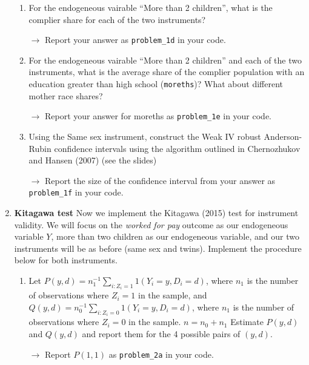 \documentclass[11pt, a4paper]{article}
\begin{document}
\begin{enumerate}
\begin{enumerate}
  \item For the endogeneous vairable ``More than 2 children'', what is
    the complier share for each of the two instruments?
    
        \hspace{10pt} $\rightarrow$ Report your answer as \texttt{problem\_1d} in your code.
        
  \item For the endogeneous vairable ``More than 2 children'' and each
    of the two instruments, what is the average share of the complier
    population with an education greater than high school
    (\texttt{moreths})? What about different mother race shares?
    
        \hspace{10pt} $\rightarrow$ Report your answer for moreths as \texttt{problem\_1e} in your code.
        
  \item Using the Same sex instrument, construct the Weak IV robust
    Anderson-Rubin confidence intervals using the algorithm outlined
    in Chernozhukov and Hansen (2007) (see the slides)
    
        \hspace{10pt} $\rightarrow$ Report the size of the confidence interval from your answer as \texttt{problem\_1f} in your code.
        
  \end{enumerate}
  
\item \textbf{Kitagawa test} Now we implement the Kitagawa
  (2015) test for instrument validity. We will focus on the
  \textit{worked for pay} outcome as our endogeneous variable $Y$,
  more than two children as our endogeneous variable, and our two
  instruments will be as before (same sex and twins). Implement the procedure below for both instruments.
  
  \begin{enumerate}
  \item Let
    $P(y,d) = n_{1}^{-1} \sum_{i : Z_{i} = 1} 1(Y_{i} = y, D_{i} = d)$,
    where $n_{1}$ is the number of observations where $Z_{i} = 1$ in
    the sample, and
    $Q(y,d) = n_{0}^{-1} \sum_{i : Z_{i} = 0} 1(Y_{i} = y, D_{i} = d)$,
    where $n_{1}$ is the number of observations where $Z_{i} = 0$ in
    the sample. $n = n_{0} + n_{1}$ Estimate $P(y,d)$ and $Q(y,d)$ and
    report them for the 4 possible pairs of $(y,d)$.
    
        \hspace{10pt} $\rightarrow$ Report $P(1,1)$ as \texttt{problem\_2a} in your code.
        

\end{enumerate}
\end{enumerate}
\end{document}
